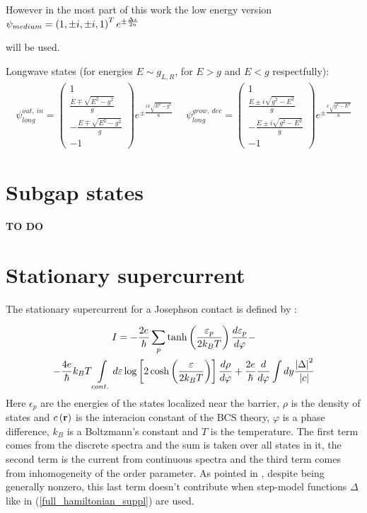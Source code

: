 However in the most part of this work the low energy version $\psi_{medium}=
\left(
1,
\pm i,
\pm i,
1
\right)^T
e^{\pm\frac{\Delta x}{2u}}  $

will be used.

Longwave states (for energies $ E\sim g_{L,R} $, for $ E>g $ and $ E<g $ respectfully):
\begin{gather}
		\psi^{out,~in}_{long}
=
\begin{pmatrix}
1\\
\frac{E\mp \sqrt{E^2-g^2}}{g}\\
-\frac{E\mp \sqrt{E^2-g^2}}{g}\\
-1
\end{pmatrix}
e^{\pm\frac{ix\sqrt{E^2-g^2}}{u}}
~~~~~~
	\psi^{grow,~dec}_{long}
	=
	\begin{pmatrix}
	1\\
	\frac{E\pm i\sqrt{g^2-E^2}}{g}\\
	-\frac{E\pm i\sqrt{g^2-E^2}}{g}\\
	-1
	\end{pmatrix}
	e^{\pm\frac{x\sqrt{g^2-E^2}}{u}}
\end{gather}
\section{Subgap states}
\label{sec:Subgap_states}
\textbf{TO DO}
\section{Stationary supercurrent }

\label{sec:stationary_supercurrent}
The stationary supercurrent for a Josephson contact is defined by \cite{Beenakker_three_universal}:

\begin{multline}
\label{beenakker_current}
	I =
	-
	\frac{2e}{\hbar}
	\sum_p
	\tanh\left(\frac{\varepsilon_p}{2k_BT}\right)
	\frac{d \varepsilon_p}{d\varphi}
	-
	\\
	-
	\frac{4e}{\hbar}
k_BT
	\int\limits_{cont.}d\varepsilon \log
	\left[
		2\cosh\left(\frac{\varepsilon}{2k_BT}\right)
	\right]
	\frac{d\rho}{d\varphi}
	+
	\frac{2e}{\hbar}
	\frac{d}{d\varphi}
	\int
	d y
		\frac{\left|\Delta\right|^2}{\left| c\right|}
\end{multline}
Here $ \epsilon_p $ are the energies of the states localized near the barrier, $ \rho$ is the density of states and $ c\left(\textbf{r}\right) $ is the interacion constant of the BCS theory, $ \varphi $ is a phase difference, $ k_B $ is a Boltzmann's constant and $ T $ is the temperature.
The first term comes from the discrete spectra and the sum is taken over all states in it, the second term is the current from continuous spectra and the third  term comes from inhomogeneity of the order parameter. As pointed in \cite{Beenakker_three_universal}, despite being generally nonzero, this last term doesn't contribute when step-model functions $ \Delta $ like in (\ref{full_hamiltonian_suppl})  are used.

